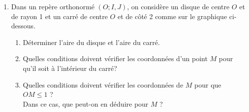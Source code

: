 \clearpage
\begin{TP}
\begin{enumerate}
\item Dans un repère orthonormé $(O; I, J)$, on considère un disque de centre $O$ et de rayon 1 et un carré de centre $O$ et de côté 2 comme sur le graphique ci-dessous.
	\begin{enumerate}
	\item Déterminer l'aire du disque et l'aire du carré.
	\item Quelles conditions doivent vérifier les coordonnées d'un point $M$ pour qu'il soit à l'intérieur du carré?
	\item Quelles conditions doivent vérifier les coordonnées de $M$ pour que $OM\leqslant 1$ ? \\
	Dans ce cas, que peut-on en déduire pour $M$ ?


\end{enumerate}
\end{enumerate}
\end{TP}
